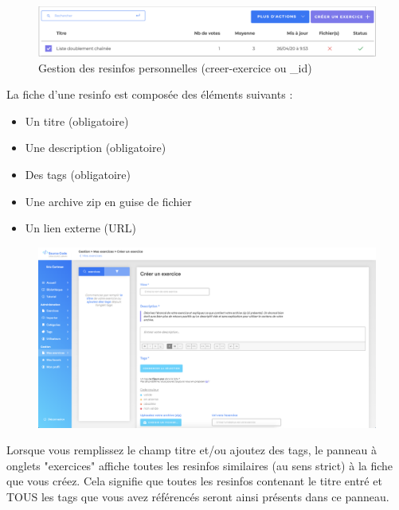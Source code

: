 \begin{figure}[H]
    \includegraphics[width=\textwidth,height=\textheight,keepaspectratio]{images/client/gestion-options.png}
    \caption[SourceCode : créer une \gls{resinfo}]{Gestion des \glspl{resinfo} personnelles (creer-exercice ou \_id)}
    \centering
\end{figure}


La fiche d'une \gls{resinfo} est composée des éléments suivants :

\begin{itemize}
    \item Un titre (obligatoire)
    \item Une description (obligatoire)
    \item Des \glspl{tag} (obligatoire)
    \item Une archive zip en guise de fichier
    \item Un lien externe (URL)
\end{itemize}

\begin{figure}[H]
    \includegraphics[width=\textwidth,height=\textheight,keepaspectratio]{images/client/create-exercise.png}
    \centering
\end{figure}

Lorsque vous remplissez le champ titre et/ou ajoutez des tags, le panneau à onglets "exercices" affiche toutes les \glspl{resinfo} similaires (au sens strict) à la \gls{fiche} que vous créez. Cela signifie que toutes les \glspl{resinfo} contenant le titre entré et TOUS les \glspl{tag} que vous avez référencés seront ainsi présents dans ce panneau.

